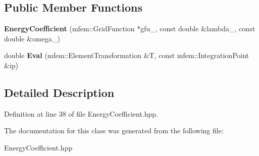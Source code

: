 \subsection*{Public Member Functions}
\begin{DoxyCompactItemize}
\item 
\mbox{\label{classEnergyCoefficient_a9d94b692ae62d84664e5179e6af3ffb9}} 
{\bfseries Energy\+Coefficient} (mfem\+::\+Grid\+Function $\ast$gfu\+\_\+, const double \&lambda\+\_\+, const double \&omega\+\_\+)
\item 
\mbox{\label{classEnergyCoefficient_a8d6c9fea967716a0252a047af09dfa21}} 
double {\bfseries Eval} (mfem\+::\+Element\+Transformation \&T, const mfem\+::\+Integration\+Point \&ip)
\end{DoxyCompactItemize}


\subsection{Detailed Description}


Definition at line 38 of file Energy\+Coefficient.\+hpp.



The documentation for this class was generated from the following file\+:\begin{DoxyCompactItemize}
\item 
Energy\+Coefficient.\+hpp\end{DoxyCompactItemize}
